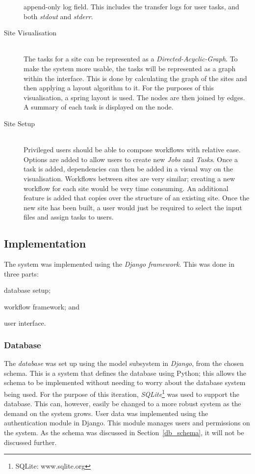 \begin{description}
        append-only log field. This includes the transfer logs for user tasks, and both
        \emph{stdout} and \emph{stderr}.
    \item[Site Visualisation] \hfill \\
        The tasks for a site can be represented as a \emph{Directed-Acyclic-Graph}. To
        make the system  more usable, the tasks will be represented as a
        graph within the interface. This is done by calculating the graph of
        the sites and then applying a layout algorithm to it. For the purposes of this
        visualisation, a spring layout is used. The nodes are then joined by edges. A
        summary of each task is displayed on the node.
    \item[Site Setup] \hfill \\
        Privileged users should be able to compose workflows with relative ease. Options
        are added to allow users to create new \emph{Jobs} and \emph{Tasks}.
	Once a task is added, dependencies can then be added in a visual way on the
	visualisation. Workflows between sites are very similar;
        creating a new workflow for each site would be very time consuming. An additional
        feature is added that copies over the structure of an existing site.
	Once the new site has been built, a user would just be required to
	select the input files and assign tasks to users.
\end{description}

\subsection{Implementation\label{iter2_impl}}

The system was implemented using the \emph{Django framework}. This was done in three parts:
\begin{inparaenum}[(i)]
\item database setup;
\item workflow framework; and
\item user interface.
\end{inparaenum}

\subsubsection{Database}
The \emph{database} was set up using the model subsystem in \emph{Django}, from the chosen schema.
This is a system that defines the database using Python; this allows the schema
to be implemented without needing to worry about the database system being used. For the
purpose of this iteration, \emph{SQLite}\footnote{SQLite: www.sqlite.org} was used to
support the database. This can, however, easily be changed to a more robust system as the demand
on the system grows. User data was implemented using the authentication module in Django. This
module manages users and permissions on the system. As the schema was discussed in Section~\ref{db_schema},
it will not be discussed further.

